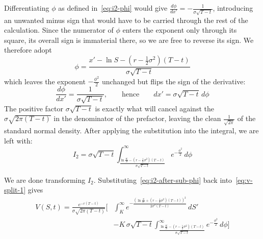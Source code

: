 \documentclass[a4paper,12pt]{article}
\numberwithin{equation}{section}
\begin{document}
Differentiating $\phi$ as defined in~\eqref{eq:i2-phi} would give
$\frac{d\phi}{dx'} = -\frac{1}{\sigma\sqrt{T-t}}$, introducing an unwanted minus
sign that would have to be carried through the rest of the calculation. Since the
numerator of $\phi$ enters the exponent only through its square, its overall sign
is immaterial there, so we are free to reverse its sign. We therefore adopt
\begin{equation}\label{eq:i2-phi-2}
  \phi = \frac{x' - \ln S - \left(r - \frac{1}{2}\sigma^2\right)(T-t)}{\sigma\sqrt{T-t}}
\end{equation}
which leaves the exponent $-\frac{\phi^2}{2}$ unchanged but flips the sign of the
derivative:
\begin{equation}\label{eq:i2-dphi}
  \frac{d\phi}{dx'} = \frac{1}{\sigma\sqrt{T-t}},
  \qquad\text{hence}\qquad
  dx' = \sigma\sqrt{T-t}\,d\phi 
\end{equation}
The positive factor $\sigma\sqrt{T-t}$ is exactly what will cancel against the
$\sigma\sqrt{2\pi(T-t)}$ in the denominator of the prefactor, leaving the clean
$\frac{1}{\sqrt{2\pi}}$ of the standard normal density.
After applying the substitution into the integral, we are left with:
\begin{equation}\label{eq:i2-after-sub-phi}
    I_2 = \sigma\sqrt{T-t}\int_{\frac{\ln{\frac{K}{S}}-\left(r-\frac{1}{2}\sigma^2\right)(T-t)}{\sigma\sqrt{T-t}}}^{\infty}
    e^{-\frac{\phi^2}{2}}
    \,d\phi
\end{equation}

We are done transforming $I_2$. Substituting~\eqref{eq:i2-after-sub-phi} back
into~\eqref{eq:v-split-1} gives
\begin{equation}\label{eq:v-split-sub-back}
\begin{aligned}
  V(S,t) = \frac{e^{-r(T-t)}}{\sigma\sqrt{2\pi(T-t)}}\Bigg[
    &\int_{K}^{\infty}
      e^{-\frac{\left(\ln\frac{S}{S'} + \left(r - \frac{1}{2}\sigma^2\right)(T-t)\right)^2}{2\sigma^2(T-t)}}
      \,dS' \\
    &- K\,\sigma\sqrt{T-t}\int_{\frac{\ln{\frac{K}{S}}-\left(r-\frac{1}{2}\sigma^2\right)(T-t)}{\sigma\sqrt{T-t}}}^{\infty}
    e^{-\frac{\phi^2}{2}}
    \,d\phi  \Bigg]
\end{aligned}
\end{equation}
\end{document}
